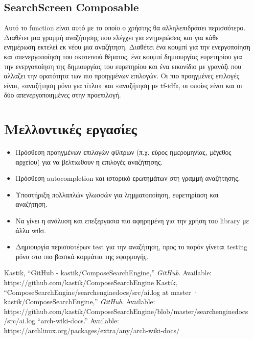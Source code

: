 \documentclass[conference]{IEEEtran}
\begin{document}
{        \subsection{SearchScreen Composable}{Αυτό το function είναι αυτό με το οποίο ο χρήστης θα αλληλεπιδράσει περισσότερο. Διαθέτει μια γραμμή αναζήτησης που ελέγχει για ενημερώσεις και για κάθε ενημέρωση εκτελεί εκ νέου μια αναζήτηση.
        Διαθέτει ένα κουμπί για την ενεργοποίηση και απενεργοποίηση του σκοτεινού θέματος, ένα κουμπί δημιουργίας ευρετηρίου για την ενεργοποίηση της δημιουργίας του ευρετηρίου και ένα εικονίδιο με γρανάζι που αλλαζει την ορατότητα των πιο προηγμένων επιλογών.
        Οι πιο προηγμένες επιλογές είναι, «αναζήτηση μόνο για τίτλο» και «αναζήτηση με tf-idf», οι οποίες είναι και οι δύο απενεργοποιημένες στην προεπιλογή.
        }\label{search-screen}

    }\label{sec:searchengineui-module}

    \section{Μελλοντικές εργασίες}{
        \begin{itemize}
            \item Πρόσθεση προηγμένων επιλογών φίλτρων (π.χ. εύρος ημερομηνίας, μέγεθος αρχείου) για να βελτιωθουν η επιλογές αναζήτησης.
            \item Πρόσθεση autocompletion και ιστορικό ερωτημάτων στη γραμμή αναζήτησης.
            \item Υποστήριξη πολλαπλών γλωσσών για λημματοποίηση, ευρετηρίαση και αναζήτηση.
            \item Να γίνει η ανάλυση και επεξεργασια πιο αφηρημένη για την χρήση του library με άλλα wiki.
            \item Δημιουργία περισσοτέρων test για την αναζήτηση, προς το παρόν γίνεται testing μόνο στα πιο βασικά κομμάτια της εφαρμογής.
        \end{itemize}
    }

    \begin{thebibliography}{00}
         Kastik, “GitHub - kastik/ComposeSearchEngine,” \textit{GitHub}. Available: https://github.com/kastik/ComposeSearchEngine
         Kastik, “ComposeSearchEngine/searchenginedocs/src/ai.log at master · kastik/ComposeSearchEngine,” \textit{GitHub}. Available: https://github.com/kastik/ComposeSearchEngine/blob/master/searchenginedocs/src/ai.log
         “arch-wiki-docs.” Available: https://archlinux.org/packages/extra/any/arch-wiki-docs/
    \end{thebibliography}
    \vspace{12pt}
\end{document}
